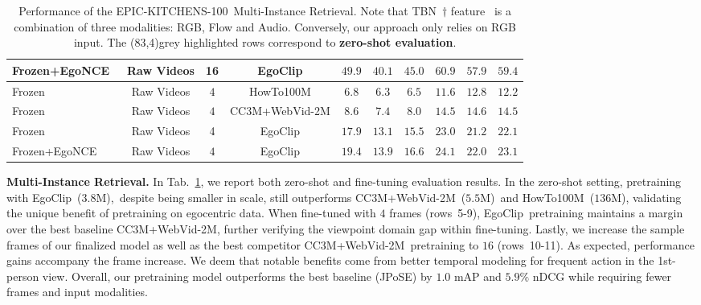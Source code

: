 \documentclass{article}
\newcommand{\dataset}{EgoClip}
\newcommand{\model}{EgoNCE\xspace}
\newcommand{\epic}{EPIC-KITCHENS-100}
\newcommand{\mir}{Multi-Instance Retrieval}
\newcommand{\ccweb}{CC3M+WebVid-2M}
\newcommand{\howto}{HowTo100M}
\begin{document}
\begin{table}[t]
{\begin{tabular}{lccc|cccccc}
    Frozen+\model~& Raw Videos& 16& \dataset & $\mathbf{49.9}$ &  $\mathbf{40.1}$ &$\mathbf{45.0}$ & $\mathbf{60.9}$ & $\mathbf{57.9}$ & $\mathbf{59.4}$\\
    \midrule[1pt]
    \rowcolor[gray]{0.9}
    Frozen~ & Raw Videos& $4$ & \howto      & $6.8$ & $6.3$ & $6.5$ & $11.6$ & $12.8$ & $12.2$  \\
    \rowcolor[gray]{0.9}
    Frozen~ & Raw Videos& $4$ & \ccweb & $8.6$ & $7.4$ & $8.0$ & $14.5$ & $14.6$ & $14.5$  \\
    \rowcolor[gray]{0.9}
    Frozen~& Raw Videos& 4& \dataset           & \underline{$17.9$} & \underline{$13.1$} & \underline{$15.5$} & \underline{$23.0$} & \underline{$21.2$} & \underline{$22.1$}  \\ 
    \rowcolor[gray]{0.9}
    Frozen+\model~& Raw Videos& $4$& \dataset& $\mathbf{19.4}$ & $\mathbf{13.9}$ & $\mathbf{16.6}$ &  $\mathbf{24.1}$ & $\mathbf{22.0}$ &$\mathbf{23.1}$  \\
    \bottomrule[1pt] 
\end{tabular}
}
\centering
\vspace{.5em}
\caption{
Performance of the \epic~Multi-Instance Retrieval.
Note that TBN~$\dagger$ feature~\cite{kazakos2019epic} is a combination of three modalities: RGB, Flow and Audio.
Conversely, our approach only relies on RGB input. 
The \colorbox{gray!20}{\makebox(83,4){grey highlighted rows}} correspond to \textbf{zero-shot evaluation}.
}
\vspace{-2.6em}
\label{mir}
\end{table}
 \textbf{\mir.}
In Tab.~\ref{mir}, we report both zero-shot and fine-tuning evaluation results. In the zero-shot setting, 
pretraining with \dataset~($3.8$M),~despite being smaller in scale, still outperforms  \ccweb~($5.5$M)~and \howto~($136$M), validating the unique benefit of pretraining on egocentric data.
When fine-tuned with $4$ frames (rows~5-9), \dataset~pretraining  maintains a margin over the best baseline \ccweb, further verifying the viewpoint domain gap within fine-tuning.
Lastly, we increase the sample frames of our finalized model as well as the best competitor \ccweb~pretraining to $16$ (rows~10-11).
As expected, performance gains accompany the frame increase. 
We deem that notable benefits come from better temporal modeling for frequent action in the 1st-person view. 
Overall, our pretraining model outperforms the best baseline (JPoSE) by $1.0$ mAP and $5.9\%$ nDCG while requiring fewer frames and input modalities.
\end{document}
